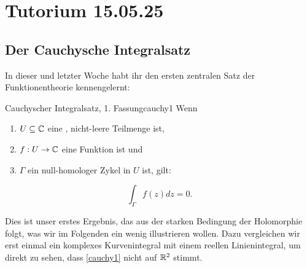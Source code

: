\section{Tutorium 15.05.25}
\label{sec:15_05_25}

\subsection{Der Cauchysche Integralsatz}
In dieser und letzter Woche habt ihr den ersten zentralen Satz der Funktionentheorie kennengelernt:
\begin{theorem}{Cauchyscher Integralsatz, 1. Fassung}{cauchy1}
Wenn 
\begin{enumerate}
\item $U \subseteq \mathbb{C}$ eine , nicht-leere Teilmenge ist,
\item $f: U \to \mathbb{C}$ eine  Funktion ist und
\item $\Gamma$ ein null-homologer Zykel in $U$ ist, gilt:
\end{enumerate}
\begin{equation}
\int_\Gamma f(z) dz = 0.
\end{equation}
\end{theorem}
Dies ist unser erstes Ergebnis, das aus der starken Bedingung der Holomorphie folgt, was wir im Folgenden ein wenig illustrieren wollen. Dazu vergleichen wir erst einmal ein komplexes Kurvenintegral mit einem reellen Linienintegral, um direkt zu sehen, dass \ref{cauchy1} nicht auf $\mathbb{R}^2$ stimmt.
